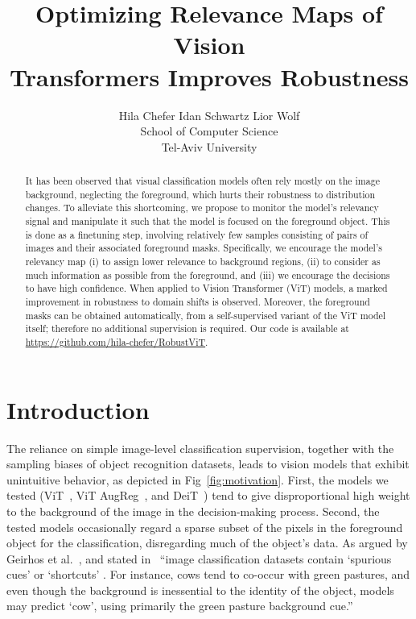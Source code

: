 \documentclass{article}
\author{}
\date{}
\title{Optimizing Relevance Maps of Vision\\ Transformers Improves Robustness}
\author{Hila Chefer \quad Idan Schwartz \quad Lior Wolf\\
  School of Computer Science\\
  Tel-Aviv University\\
}
\begin{document}
\maketitle


\begin{abstract}

It has been observed that visual classification models often rely mostly on the image background, neglecting the foreground, which hurts their robustness to distribution changes.  
To alleviate this shortcoming, we propose to monitor the model's relevancy signal and manipulate it such that the model is focused on the foreground object.
This is done as a finetuning step, involving relatively few samples consisting of pairs of images and their associated foreground masks. Specifically, we encourage the model's relevancy map (i) to assign lower relevance to background regions, (ii) to consider as much information as possible from the foreground, and (iii) we encourage the decisions to have high confidence. When applied to Vision Transformer (ViT) models, a marked improvement in robustness to domain shifts is observed. Moreover, the foreground masks can be obtained automatically, from a self-supervised variant of the ViT model itself; therefore no additional supervision is required.
Our code is available at \url{https://github.com/hila-chefer/RobustViT}.
\end{abstract}

\section{Introduction}

The reliance on simple image-level classification supervision, together with the sampling biases of object recognition datasets, leads to vision models that exhibit unintuitive behavior, as depicted in  Fig~\ref{fig:motivation}. First, the models we tested (ViT~\cite{dosovitskiy2020image}, ViT AugReg~\cite{Steiner2021HowTT}, and DeiT~\cite{touvron2020training}) tend to give disproportional high weight to the background of the image in the decision-making process.  
Second, the tested models occasionally regard a sparse subset of the pixels in the foreground object for the classification, disregarding much of the object's data. As argued by Geirhos et al.~\cite{Geirhos2020ShortcutLI}, and stated in~\cite{Hendrycks_2021_CVPR} ``image classification datasets contain `spurious cues' or `shortcuts' . For instance, cows tend to co-occur with green pastures, and even though the background is inessential to the identity of the object, models may predict `cow', using primarily the green pasture background cue.''
\end{document}
